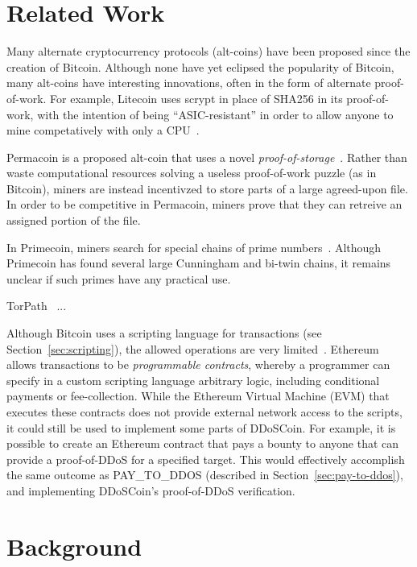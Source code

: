 
\section{Related Work}

Many alternate cryptocurrency protocols (alt-coins) have been proposed since the
creation of Bitcoin. Although none have yet eclipsed the popularity of Bitcoin,
many alt-coins have interesting innovations, often in the form of alternate
proof-of-work. For example, Litecoin uses scrypt in place of SHA256 in its
proof-of-work, with the intention of being ``ASIC-resistant'' in order to allow
anyone to mine competatively with only a CPU~\cite{litecoin}.

Permacoin is a proposed alt-coin that uses a novel
\emph{proof-of-storage}~\cite{permacoin}.  Rather than waste computational
resources solving a useless proof-of-work puzzle (as in Bitcoin), miners are
instead incentivzed to store parts of a large agreed-upon file. In order to be
competitive in Permacoin, miners prove that they can retreive an assigned
portion of the file.

In Primecoin, miners search for special chains of prime
numbers~\cite{primecoin}. Although Primecoin has found several large Cunningham
and bi-twin chains, it remains unclear if such primes have any practical use.

TorPath~\cite{torpath} ... \TK

Although Bitcoin uses a scripting language for transactions (see
Section~\ref{sec:scripting}), the allowed operations are very
limited~\cite{bitcoin-paper}. Ethereum allows transactions to be
\emph{programmable contracts}, whereby a programmer can specify in a custom
scripting language arbitrary logic, including conditional payments or
fee-collection. While the Ethereum Virtual Machine (EVM) that executes these
contracts does not provide external network access to the scripts, it could
still be used to implement some parts of DDoSCoin. For example, it is possible
to create an Ethereum contract that pays a bounty to anyone that can provide a
proof-of-DDoS for a specified target. This would effectively accomplish the same
outcome as PAY\_TO\_DDOS (described in Section~\ref{sec:pay-to-ddos}), and
implementing DDoSCoin's proof-of-DDoS verification.


\section{Background}

